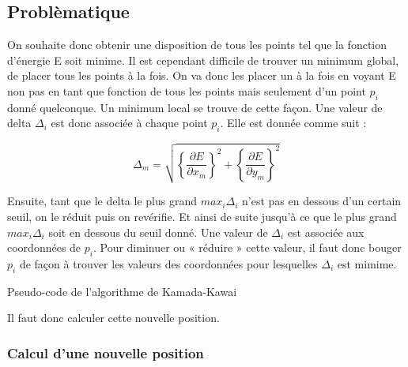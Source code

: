 \documentclass[a4paper,12pt]{article}
\begin{document}
\subsection{Problèmatique}

On souhaite donc obtenir une disposition de tous les points tel que la fonction d’énergie E soit minime. Il est cependant difficile de trouver un minimum global, de placer tous les points à la fois. On va donc les placer un à la fois en voyant E non pas en tant que fonction de tous les points mais seulement d’un point $p_i$ donné quelconque. Un minimum local se trouve de cette façon. Une valeur de delta $\Delta_i$ est donc associée à chaque point $p_i$. Elle est donnée comme suit :

$$ \Delta_m = \sqrt{ \left\{\frac{\partial E}{\partial x_m}\right\}^2 + \left\{\frac{\partial E}{\partial y_m}\right\}^2} $$

Ensuite, tant que le delta le plus grand $max_i \Delta_i$ n’est pas en dessous d’un certain seuil, on le réduit puis on revérifie. Et ainsi de suite jusqu’à ce que le plus grand $max_i \Delta_i$ soit en dessous du seuil donné. Une valeur de $\Delta_i$ est associée aux coordonnées de $p_i$. Pour diminuer ou « réduire » cette valeur, il faut donc bouger $p_i$ de façon à trouver les valeurs des coordonnées pour lesquelles $\Delta_i$ est mimime.

\begin{algorithm}[H]
\caption{Pseudo-code de l'algorithme de Kamada-Kawai}\label{alg:cap}


\end{algorithm}

Il faut donc calculer cette nouvelle position.

\subsubsection{Calcul d'une nouvelle position}
\end{document}
